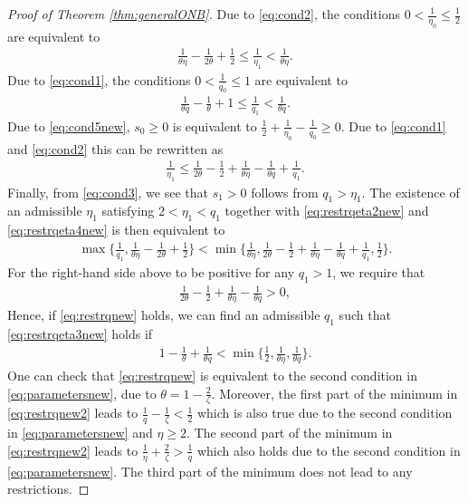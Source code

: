 \documentclass[reqno]{amsart}
\theoremstyle{plain}
\theoremstyle{remark}
\theoremstyle{plain}
\numberwithin{equation}{section}
\newcommand{\1}{\one}
\begin{document}
\begin{proof}[Proof of Theorem \ref{thm:generalONB}]
Due to \eqref{eq:cond2}, the conditions $0<\frac{1}{\eta_0}\leq \frac12$ are equivalent to 
\begin{align}
\label{eq:restrqeta2new}
\frac{1}{\theta \eta} - \frac{1}{2\theta}+\frac12\leq \frac{1}{\eta_1}<\frac{1}{\theta \eta}.
\end{align} 
Due to \eqref{eq:cond1}, the conditions $0<\frac{1}{q_0}\leq 1$ are equivalent to 
\begin{align}
\label{eq:restrqeta3new}
\frac{1}{\theta q} - \frac{1}{\theta}+1\leq\frac{1}{q_1}<\frac{1}{\theta q}.
\end{align} 
Due to \eqref{eq:cond5new}, $s_0\geq 0$ is equivalent to $\frac{1}{2} + \frac{1}{\eta_0}- \frac{1}{q_0}\geq 0$. Due to \eqref{eq:cond1} and \eqref{eq:cond2} this can be rewritten as
\begin{align}\label{eq:restrqeta4new}
\frac{1}{\eta_1}\leq \frac{1}{2\theta} - \frac{1}{2} + \frac{1}{\theta \eta} - \frac{1}{\theta q} + \frac{1}{q_1}. 
\end{align}
Finally, from \eqref{eq:cond3}, we see that $s_1>0$ follows from $q_1>\eta_1$. 
The existence of an admissible $\eta_1$ satisfying  $2<\eta_1<q_1$ together with \eqref{eq:restrqeta2new} and \eqref{eq:restrqeta4new} is then equivalent to 
\begin{align}
\label{eq:restreta_1 combined}
\max\Big\{\frac{1}{q_1}, \frac{1}{\theta \eta} - \frac{1}{2\theta}+\frac12\Big\}<\min\Big\{\frac{1}{\theta \eta}, \frac{1}{2\theta} - \frac{1}{2} + \frac{1}{\theta \eta} - \frac{1}{\theta q} + \frac{1}{q_1}, \frac12\Big\}.
\end{align}
For the right-hand side above to be positive for any $q_1>1$, we require that 
\begin{align}
\label{eq:restrqnew}
\frac{1}{2\theta} - \frac{1}{2} + \frac{1}{\theta \eta} - \frac{1}{\theta q}>0,
\end{align}
Hence, if \eqref{eq:restrqnew} holds,
we can find an admissible $q_1$ such that \eqref{eq:restrqeta3new} holds 
if
\begin{align}\label{eq:restrqnew2}
1 - \frac{1}{\theta} +\frac{1}{\theta q} <\min\Big\{\frac12,\frac{1}{\theta \eta}, \frac{1}{\theta q}\Big\}.
\end{align}
One can check that \eqref{eq:restrqnew} is equivalent to the second condition in \eqref{eq:parametersnew}, due to $\theta = 1-\tfrac{2}{\zeta}$. Moreover, 
the first part of the minimum in \eqref{eq:restrqnew2} leads to $\frac{1}{q} - \frac{1}{\zeta} <\frac12$ which is also true due to the second condition in \eqref{eq:parametersnew} and $\eta\geq 2$. The second part of the minimum in \eqref{eq:restrqnew2} leads to $\frac{1}{\eta}  +\frac{2}{\zeta} > \frac{1}{q}$ which also holds due to the second condition in \eqref{eq:parametersnew}. The third part of the minimum does not lead to any restrictions. 
\end{proof}
\end{document}
